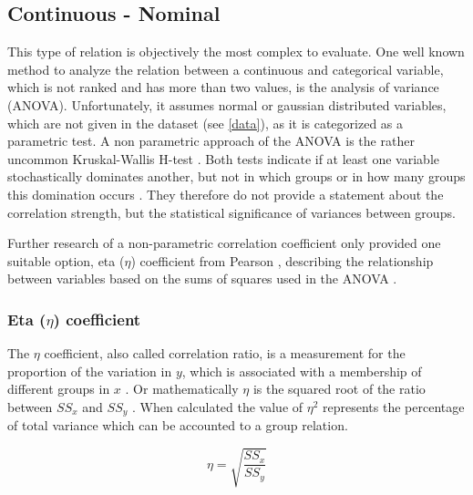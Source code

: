\subsection{Continuous - Nominal}
This type of relation is objectively the most complex to evaluate. One well known method to analyze the relation between a continuous and categorical variable, which is not ranked and has more than two values, is the analysis of variance (ANOVA). Unfortunately, it assumes normal or gaussian distributed variables, which are not given in the dataset (see \cref{data}), as it is categorized as a parametric test. A non parametric approach of the ANOVA is the rather uncommon Kruskal-Wallis H-test \parencite{Leon1998}. Both tests indicate if at least one variable stochastically dominates another, but not in which groups or in how many groups this domination occurs \parencite{OTSD2020}. They therefore do not provide a statement about the correlation strength, but the statistical significance of variances between groups.

Further research of a non-parametric correlation coefficient only provided one suitable option, eta ($\eta$) coefficient from Pearson \parencite{Benninghaus2007}, describing the relationship between variables based on the sums of squares used in the ANOVA \parencite{Lewis2012,Benninghaus2007}.

\subsubsection{Eta ($\eta$) coefficient}
The $\eta$ coefficient, also called correlation ratio, is a measurement for the proportion of the variation in $y$, which is associated with a membership of different groups in $x$ \parencite{Laken2013}. Or mathematically $\eta$ is the squared root of the ratio between $SS_x$ and $SS_y$ \parencite{Shaldehi2013,SAGE2014}. When calculated the value of $\eta^2$ represents the percentage of total variance which can be accounted to a group relation.

\smallskip
\begin{equation}
\label{formula_eta}	
	\eta = \sqrt{\frac{SS_x}{SS_y}}
\end{equation}


